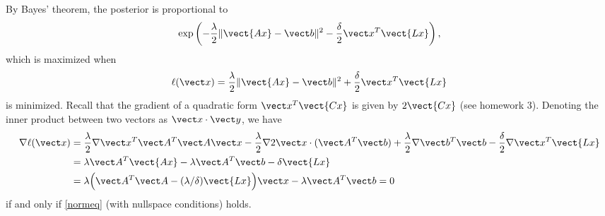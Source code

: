 \documentclass{homework}
\begin{document}


\begin{solution}
  By Bayes' theorem, the posterior is proportional to
  $$
  \exp\left( - \frac\lambda2\|\vect{Ax} - \vect b\|^2 - \frac{\delta}{2}\vect x^T\vect{Lx}\right),
  $$
  which is maximized when 
  $$
  \ell(\vect x) = \frac\lambda2\|\vect{Ax} - \vect b\|^2 + \frac{\delta}{2}\vect x^T\vect{Lx}
  $$
  is minimized.  Recall that the gradient of a quadratic form $\vect x^T\vect{Cx}$ is given by $2\vect{Cx}$ (see homework 3). 
  Denoting the inner product between two vectors as $\vect x \cdot \vect y$, we have
  \begin{align*}
    \nabla \ell(\vect x) 
    &= \frac{\lambda}2 \nabla \vect x^T \vect A^T \vect A\vect x - \frac{\lambda}2\nabla 2\vect x \cdot (\vect A^T \vect b) + \frac{\lambda}2\nabla \vect b^T\vect b -\frac{\delta}2 \nabla \vect x^T\vect{Lx}\\
    &= \lambda \vect A^T\vect{Ax} - \lambda \vect A^T \vect b - \delta\vect{Lx} \\
    &= \lambda \Big(\vect A^T \vect A - (\lambda/\delta)\vect{Lx}\Big)\vect x - \lambda \vect A^T\vect b= 0\\
  \end{align*}
  if and only if \eqref{normeq} (with nullspace conditions) holds.
\end{solution}

\end{document}

